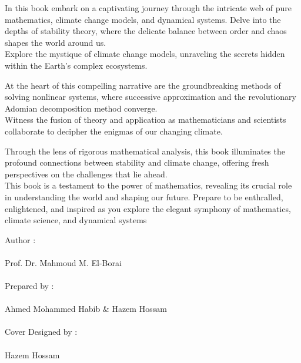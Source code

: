\documentclass[]{article}
\begin{document}
\vspace*{.5cm}
{\fontsize{15pt}{0} \Garamondfont \selectfont
In this book embark on a captivating journey through the intricate web of pure mathematics, climate change models, and dynamical systems. Delve into the depths of stability theory, where the delicate balance between order and chaos shapes the world around us. 
\\Explore the mystique of climate change models, unraveling the secrets hidden within the Earth's complex ecosystems.
\par
\vspace*{1cm}
At the heart of this compelling narrative are the groundbreaking methods of solving nonlinear systems, where successive approximation and the revolutionary Adomian decomposition method converge. 
\\Witness the fusion of theory and application as mathematicians and scientists collaborate to decipher the enigmas of our changing climate.
\par
\vspace*{1cm}
Through the lens of rigorous mathematical analysis, 
this book illuminates the profound connections between stability and climate change, offering fresh perspectives on the challenges that lie ahead. 
\\This book is a testament to the power of mathematics, revealing its crucial role in understanding the world and shaping our future. Prepare to be enthralled, enlightened, and inspired as you explore the elegant symphony of mathematics, climate science, and dynamical systems
}

\par
\vspace*{5cm}
{\fontsize{20pt}{0}
Author : \\\\
\color{white} \fancyfont Prof. Dr. Mahmoud M. El-Borai
\\ \\ 
\color{cover}Prepared by :\\\\
\color{white} \fancyfont Ahmed Mohammed Habib \& Hazem Hossam
\\ \\
\color{cover} Cover Designed by :\\\\
\color{white} \fancyfont Hazem Hossam
}
\restoregeometry
\endgroup
\end{document}

